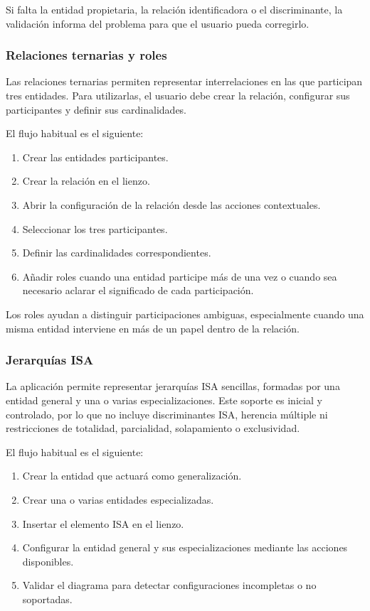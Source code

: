 Si falta la entidad propietaria, la relación identificadora o el discriminante, la validación informa del problema para que el usuario pueda corregirlo.

\subsubsection{Relaciones ternarias y roles}

Las relaciones ternarias permiten representar interrelaciones en las que participan tres entidades. Para utilizarlas, el usuario debe crear la relación, configurar sus participantes y definir sus cardinalidades.

El flujo habitual es el siguiente:

\begin{enumerate}
    \item Crear las entidades participantes.
    \item Crear la relación en el lienzo.
    \item Abrir la configuración de la relación desde las acciones contextuales.
    \item Seleccionar los tres participantes.
    \item Definir las cardinalidades correspondientes.
    \item Añadir roles cuando una entidad participe más de una vez o cuando sea necesario aclarar el significado de cada participación.
\end{enumerate}

Los roles ayudan a distinguir participaciones ambiguas, especialmente cuando una misma entidad interviene en más de un papel dentro de la relación.

\subsubsection{Jerarquías ISA}

La aplicación permite representar jerarquías ISA sencillas, formadas por una entidad general y una o varias especializaciones. Este soporte es inicial y controlado, por lo que no incluye discriminantes ISA, herencia múltiple ni restricciones de totalidad, parcialidad, solapamiento o exclusividad.

El flujo habitual es el siguiente:

\begin{enumerate}
    \item Crear la entidad que actuará como generalización.
    \item Crear una o varias entidades especializadas.
    \item Insertar el elemento ISA en el lienzo.
    \item Configurar la entidad general y sus especializaciones mediante las acciones disponibles.
    \item Validar el diagrama para detectar configuraciones incompletas o no soportadas.
\end{enumerate}

